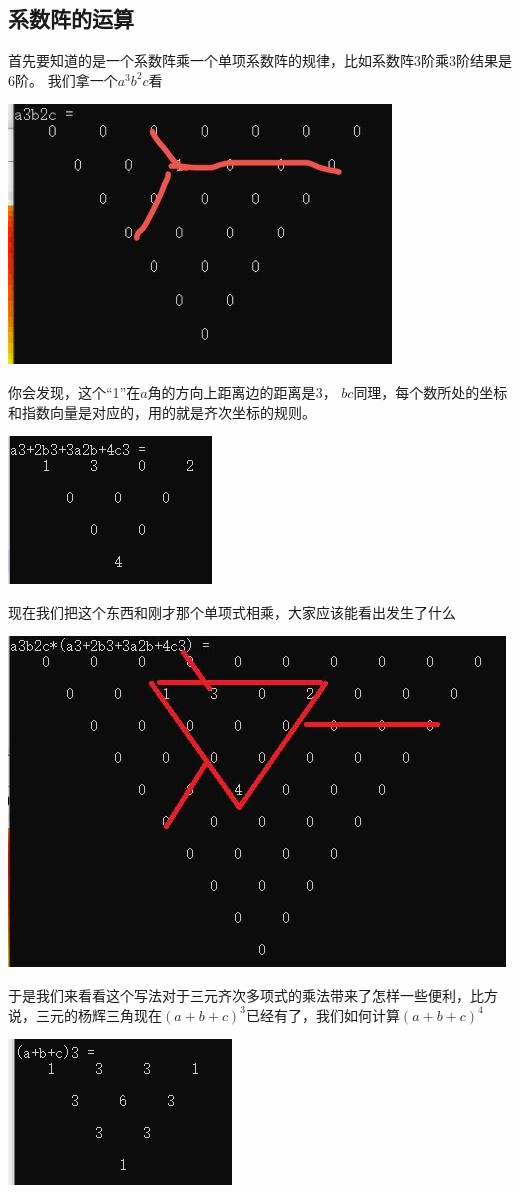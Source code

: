 \documentclass[UTF8]{ctexart}
\begin{document}
\subsection{系数阵的运算}

首先要知道的是一个系数阵乘一个单项系数阵的规律，比如系数阵$ 3 $阶乘$ 3 $阶结果是$ 6 $阶。
我们拿一个$ a^{3}b^{2}c $看
 \begin{center}
 	\includegraphics[width=0.36\linewidth]{010}
 \end{center}
你会发现，这个“1”在$ a $角的方向上距离边的距离是$ 3 $，
$ bc $同理，每个数所处的坐标和指数向量是对应的，用的就是齐次坐标的规则。
\begin{center}
	\includegraphics[width=0.25\linewidth]{020}
\end{center}
现在我们把这个东西和刚才那个单项式相乘，大家应该能看出发生了什么
\begin{center}
	\includegraphics[width=0.4\linewidth]{030}
\end{center}
于是我们来看看这个写法对于三元齐次多项式的乘法带来了怎样一些便利，比方说，三元的杨辉三角现在$ (a+b+c)^{3} $已经有了，我们如何计算$ (a+b+c)^{4} $
\begin{center}
	\includegraphics[width=0.3\linewidth]{040}
\end{center}
\end{document}
